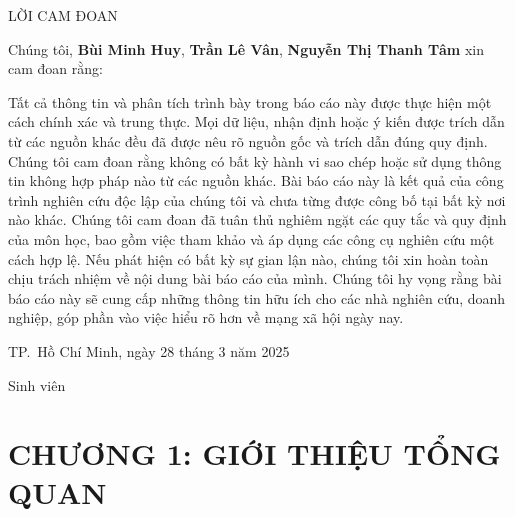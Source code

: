 \documentclass[
]{article}
\author{}
\date{\vspace{-2.5em}}
\begin{document}


\newpage
\thispagestyle{empty}

\begin{center}
    \LARGE {LỜI CAM ĐOAN}
\end{center}
\vspace{1.5em}

Chúng tôi, \textbf{Bùi Minh Huy}, \textbf{Trần Lê Vân}, \textbf{Nguyễn
Thị Thanh Tâm} xin cam đoan rằng:

Tất cả thông tin và phân tích trình bày trong báo cáo này được thực hiện
một cách chính xác và trung thực. Mọi dữ liệu, nhận định hoặc ý kiến
được trích dẫn từ các nguồn khác đều đã được nêu rõ nguồn gốc và trích
dẫn đúng quy định. Chúng tôi cam đoan rằng không có bất kỳ hành vi sao
chép hoặc sử dụng thông tin không hợp pháp nào từ các nguồn khác. Bài
báo cáo này là kết quả của công trình nghiên cứu độc lập của chúng tôi
và chưa từng được công bố tại bất kỳ nơi nào khác. Chúng tôi cam đoan đã
tuân thủ nghiêm ngặt các quy tắc và quy định của môn học, bao gồm việc
tham khảo và áp dụng các công cụ nghiên cứu một cách hợp lệ. Nếu phát
hiện có bất kỳ sự gian lận nào, chúng tôi xin hoàn toàn chịu trách nhiệm
về nội dung bài báo cáo của mình. Chúng tôi hy vọng rằng bài báo cáo này
sẽ cung cấp những thông tin hữu ích cho các nhà nghiên cứu, doanh
nghiệp, góp phần vào việc hiểu rõ hơn về mạng xã hội ngày nay.

\vspace{3em}

\begin{flushright}
\begin{minipage}{0.5\textwidth}
\raggedleft
TP.\ Hồ Chí Minh, ngày 28 tháng 3 năm 2025

\vspace{1em}

\centering
{\LARGE Sinh viên}
\end{minipage}
\end{flushright}

\newpage
\thispagestyle{empty}
\tableofcontents

\newpage
\thispagestyle{empty}
\listoffigures

\newpage
{}
\setcounter{page}{1}

\section*{CHƯƠNG 1: GIỚI THIỆU TỔNG QUAN}
\setcounter{section}{1}
\end{document}
